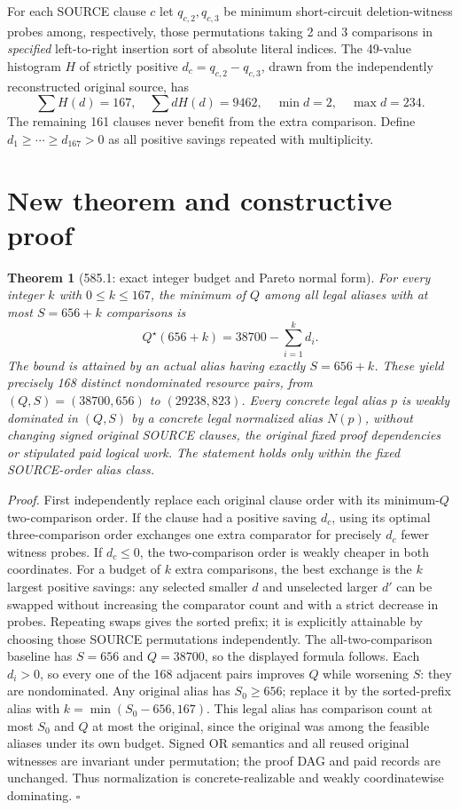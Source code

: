 \documentclass[11pt]{article}
\newtheorem{theorem}{Theorem}
\begin{document}
For each SOURCE clause $c$ let $q_{c,2},q_{c,3}$ be minimum short-circuit deletion-witness probes among, respectively, those permutations taking 2 and 3 comparisons in \emph{specified} left-to-right insertion sort of absolute literal indices. The 49-value histogram $H$ of strictly positive $d_c=q_{c,2}-q_{c,3}$, drawn from the independently reconstructed original source, has
\[
\sum H(d)=167,\quad \sum dH(d)=9462,\quad \min d=2,\quad\max d=234.
\]
The remaining 161 clauses never benefit from the extra comparison. Define $d_1\ge\cdots\ge d_{167}>0$ as all positive savings repeated with multiplicity.

\section*{New theorem and constructive proof}
\begin{theorem}[585.1: exact integer budget and Pareto normal form]
For every integer $k$ with $0\le k\le167$, the minimum of $Q$ among all legal aliases with at most $S=656+k$ comparisons is
\[
\boxed{Q^\star(656+k)=38700-\sum_{i=1}^{k}d_i.}
\]
The bound is attained by an actual alias having \emph{exactly} $S=656+k$. These yield precisely 168 distinct nondominated resource pairs, from $(Q,S)=(38700,656)$ to $(29238,823)$. Every concrete legal alias $p$ is weakly dominated in $(Q,S)$ by a \emph{concrete} legal normalized alias $N(p)$, without changing signed original SOURCE clauses, the original fixed proof dependencies or stipulated paid logical work. The statement holds only within the fixed SOURCE-order alias class.
\end{theorem}
\noindent\emph{Proof.}
First independently replace each original clause order with its minimum-$Q$ two-comparison order. If the clause had a positive saving $d_c$, using its optimal three-comparison order exchanges one extra comparator for precisely $d_c$ fewer witness probes. If $d_c\le0$, the two-comparison order is weakly cheaper in both coordinates. For a budget of $k$ extra comparisons, the best exchange is the $k$ largest positive savings: any selected smaller $d$ and unselected larger $d'$ can be swapped without increasing the comparator count and with a strict decrease in probes. Repeating swaps gives the sorted prefix; it is explicitly attainable by choosing those SOURCE permutations independently. The all-two-comparison baseline has $S=656$ and $Q=38700$, so the displayed formula follows. Each $d_i>0$, so every one of the 168 adjacent pairs improves $Q$ while worsening $S$: they are nondominated. Any original alias has $S_0\ge656$; replace it by the sorted-prefix alias with $k=\min(S_0-656,167)$. This legal alias has comparison count at most $S_0$ and $Q$ at most the original, since the original was among the feasible aliases under its own budget. Signed OR semantics and all reused original witnesses are invariant under permutation; the proof DAG and paid records are unchanged. Thus normalization is concrete-realizable and weakly coordinatewise dominating. \(\square\)
\end{document}
